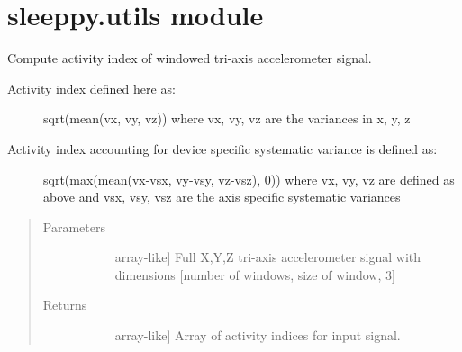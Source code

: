 \documentclass[letterpaper,10pt,english]{sphinxmanual}
\begin{document}
\section{sleeppy.utils module}
\label{\detokenize{index:module-sleeppy.utils}}\label{\detokenize{index:sleeppy-utils-module}}

\begin{fulllineitems}
\label{\detokenize{index:sleeppy.utils.activity_index}}
Compute activity index of windowed tri-axis accelerometer signal.
\begin{description}
\item[{Activity index defined here as:}] \leavevmode
sqrt(mean(vx, vy, vz))
where vx, vy, vz are the variances in x, y, z

\item[{Activity index accounting for device specific systematic variance is defined as:}] \leavevmode
sqrt(max(mean(vx-vsx, vy-vsy, vz-vsz), 0))
where vx, vy, vz are defined as above and vsx, vsy, vsz are the axis
specific systematic variances

\end{description}
\begin{quote}\begin{description}
\item[{Parameters}] \leavevmode\begin{description}
\item[{}] \leavevmode{[}array-like{]}
Full X,Y,Z tri-axis accelerometer signal with dimensions {[}number of windows, size of window, 3{]}

\end{description}

\item[{Returns}] \leavevmode\begin{description}
\item[{}] \leavevmode{[}array-like{]}
Array of activity indices for input signal.

\end{description}

\end{description}\end{quote}

\end{fulllineitems}
\end{document}
